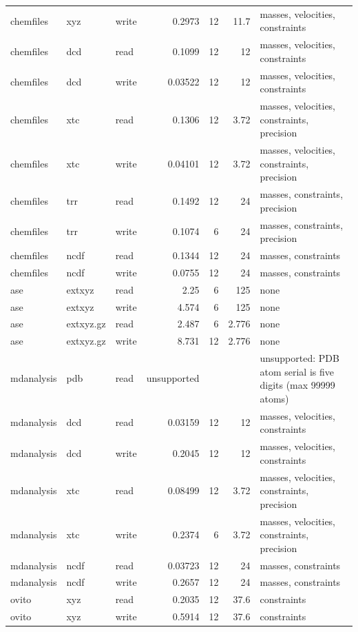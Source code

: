 {\begin{longtable}{@{}lllrr r p{}@{}}
chemfiles & xyz & write & 0.2973 & 12 & 11.7 & masses, velocities, constraints \\
chemfiles & dcd & read & 0.1099 & 12 & 12 & masses, velocities, constraints \\
chemfiles & dcd & write & 0.03522 & 12 & 12 & masses, velocities, constraints \\
chemfiles & xtc & read & 0.1306 & 12 & 3.72 & masses, velocities, constraints, precision \\
chemfiles & xtc & write & 0.04101 & 12 & 3.72 & masses, velocities, constraints, precision \\
chemfiles & trr & read & 0.1492 & 12 & 24 & masses, constraints, precision \\
chemfiles & trr & write & 0.1074 & 6 & 24 & masses, constraints, precision \\
chemfiles & ncdf & read & 0.1344 & 12 & 24 & masses, constraints \\
chemfiles & ncdf & write & 0.0755 & 12 & 24 & masses, constraints \\
ase & extxyz & read & 2.25 & 6 & 125 & none \\
ase & extxyz & write & 4.574 & 6 & 125 & none \\
ase & extxyz.gz & read & 2.487 & 6 & 2.776 & none \\
ase & extxyz.gz & write & 8.731 & 12 & 2.776 & none \\
mdanalysis & pdb & read & unsupported &  &  & unsupported: PDB atom serial is five digits (max 99999 atoms) \\
mdanalysis & dcd & read & 0.03159 & 12 & 12 & masses, velocities, constraints \\
mdanalysis & dcd & write & 0.2045 & 12 & 12 & masses, velocities, constraints \\
mdanalysis & xtc & read & 0.08499 & 12 & 3.72 & masses, velocities, constraints, precision \\
mdanalysis & xtc & write & 0.2374 & 6 & 3.72 & masses, velocities, constraints, precision \\
mdanalysis & ncdf & read & 0.03723 & 12 & 24 & masses, constraints \\
mdanalysis & ncdf & write & 0.2657 & 12 & 24 & masses, constraints \\
ovito & xyz & read & 0.2035 & 12 & 37.6 & constraints \\
ovito & xyz & write & 0.5914 & 12 & 37.6 & constraints \\
\bottomrule
\end{longtable}
}


